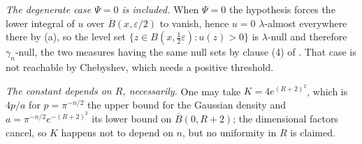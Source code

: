 \begin{lemma}
\emph{The degenerate case $\Psi = 0$ is included.}  When $\Psi = 0$ the
hypothesis forces the lower integral of $u$ over
$\overline B(x,\varepsilon/2)$ to vanish, hence $u = 0$ $\lambda$-almost
everywhere there by (a), so the level set
$\{z \in B(x,\tfrac12\varepsilon) : u(z) > 0\}$ is $\lambda$-null and therefore
$\gamma_n$-null, the two measures having the same null sets by clause (4) of
.  That case is not reachable by
Chebyshev, which needs a positive threshold.

\emph{The constant depends on $R$, necessarily.}  One may take
$K = 4e^{(R+2)^2}$, which is $4p/a$ for $p = \pi^{-n/2}$ the upper bound for
the Gaussian density and $a = \pi^{-n/2}e^{-(R+2)^2}$ its lower bound on
$\overline B(0,R+2)$; the dimensional factors cancel, so $K$ happens not to
depend on $n$, but no uniformity in $R$ is claimed.
\end{lemma}
